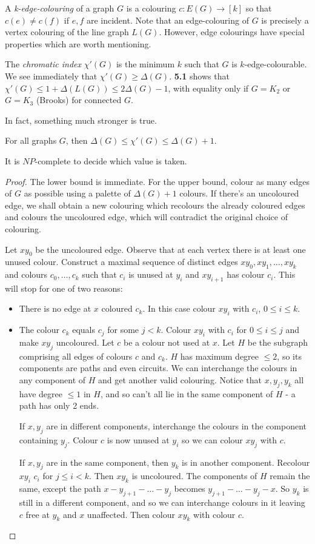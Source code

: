 \documentclass[10pt,a4paper]{article}
\begin{document}
A \emph{k-edge-colouring} of a graph $G$ is a colouring $c:E(G)\to [k]$ so that $c(e)\neq c(f)$ if $e,f$ are incident. Note that an edge-colouring of $G$ is precisely a vertex colouring of the line graph $L(G)$. However, edge colourings have special properties which are worth mentioning.

The \emph{chromatic index} $\chi'(G)$ is the minimum $k$ such that $G$ is $k$-edge-colourable. We see immediately that $\chi'(G) \geq \Delta(G)$. \textbf{5.1} shows that $\chi'(G) \leq 1+\Delta(L(G)) \leq 2\Delta(G)-1$, with equality only if $G = K_2$ or $G=K_3$ (Brooks) for connected $G$.

In fact, something much stronger is true.
\begin{theorem}[Vizing]
For all graphs $G$, then $\Delta(G) \leq \chi'(G) \leq \Delta(G)+1$.
\end{theorem}
It is $NP$-complete to decide which value is taken.
\begin{proof}
The lower bound is immediate. For the upper bound, colour as many edges of $G$ as possible using a palette of $\Delta(G)+1$ colours. If there's an uncoloured edge, we shall obtain a new colouring which recolours the already coloured edges and colours the uncoloured edge, which will contradict the original choice of colouring.

Let $xy_0$ be the uncoloured edge. Observe that at each vertex there is at least one unused colour. Construct a maximal sequence of distinct edges $xy_0, xy_1, \ldots, xy_k$ and colours $c_0,\ldots,c_k$ such that $c_i$ is unused at $y_i$ and $xy_{i+1}$ has colour $c_i$. This will stop for one of two reasons:
\begin{itemize}
\item There is no edge at $x$ coloured $c_k$. In this case colour $xy_i$ with $c_i$, $0\leq i\leq k$.
\item The colour $c_k$ equals $c_j$ for some $j < k$. Colour $xy_i$ with $c_i$ for $0\leq i\leq j$ and make $xy_j$ uncoloured. Let $c$ be a colour not used at $x$. Let $H$ be the subgraph comprising all edges of colours $c$ and $c_k$. $H$ has maximum degree $\leq 2$, so its components are paths and even circuits. We can interchange the colours in any component of $H$ and get another valid colouring. Notice that $x, y_j, y_k$ all have degree $\leq 1$ in $H$, and so can't all lie in the same component of $H$ - a path has only 2 ends.

If $x, y_j$ are in different components, interchange the colours in the component containing $y_j$. Colour $c$ is now unused at $y_i$ so we can colour $xy_j$ with $c$.

If $x, y_j$ are in the same component, then $y_k$ is in another component. Recolour $xy_i$ $c_i$ for $j\leq i < k$. Then $xy_k$ is uncoloured. The components of $H$ remain the same, except the path $x-y_{j+1}-\ldots-y_j$ becomes $y_{j+1}-\ldots-y_j-x$. So $y_k$ is still in a different component, and so we can interchange colours in it leaving $c$ free at $y_k$ and $x$ unaffected. Then colour $xy_k$ with colour $c$.
\end{itemize}
\end{proof}
\end{document}
